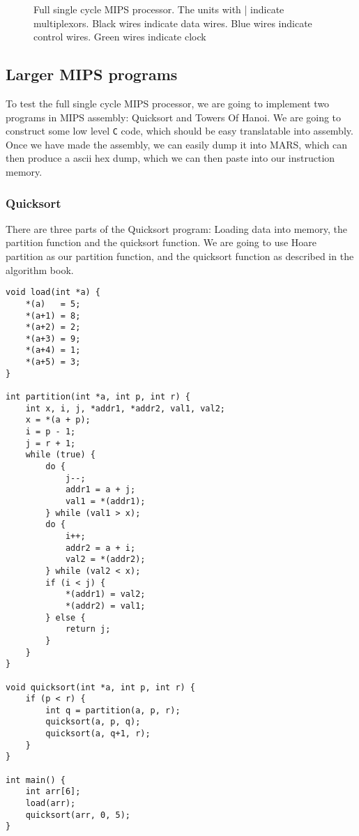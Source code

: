 \begin{figure}
{
    }
    \caption{Full single cycle MIPS processor. The units with | indicate
    multiplexors. Black wires indicate data wires. Blue wires indicate control
    wires. Green wires indicate clock}
    \label{fig:single-proc-full}
\end{figure}
\subsection{Larger MIPS programs}
To test the full single cycle MIPS processor, we are going to implement two
programs in MIPS assembly: Quicksort and Towers Of Hanoi. We are going to
construct some low level \texttt{C} code, which should be easy translatable
into assembly. Once we have made the assembly, we can easily dump it into MARS,
which can then produce a ascii hex dump, which we can then paste into our
instruction memory.

\subsubsection*{Quicksort}
There are three parts of the Quicksort program: Loading data into memory,
the partition function and the quicksort function. We are going to use Hoare
partition as our partition function, and the quicksort function as described in
the algorithm book.

\begin{lstlisting}
void load(int *a) {
    *(a)   = 5;
    *(a+1) = 8;
    *(a+2) = 2;
    *(a+3) = 9;
    *(a+4) = 1;
    *(a+5) = 3;
}

int partition(int *a, int p, int r) {
    int x, i, j, *addr1, *addr2, val1, val2;
    x = *(a + p);
    i = p - 1;
    j = r + 1;
    while (true) {
        do {
            j--;
            addr1 = a + j;
            val1 = *(addr1);
        } while (val1 > x);
        do {
            i++;
            addr2 = a + i;
            val2 = *(addr2);
        } while (val2 < x);
        if (i < j) {
            *(addr1) = val2;
            *(addr2) = val1;
        } else {
            return j;
        }
    }
}

void quicksort(int *a, int p, int r) {
    if (p < r) {
        int q = partition(a, p, r);
        quicksort(a, p, q);
        quicksort(a, q+1, r);
    }
}

int main() {
    int arr[6];
    load(arr);
    quicksort(arr, 0, 5);
}
\end{lstlisting}

